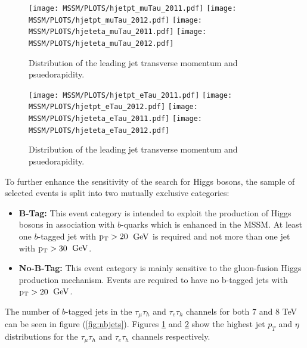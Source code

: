 \begin{figure}[htbp]
  \begin{center}
    \texttt{[image: MSSM/PLOTS/hjetpt\_muTau\_2011.pdf]}
    \texttt{[image: MSSM/PLOTS/hjetpt\_muTau\_2012.pdf]}
    \texttt{[image: MSSM/PLOTS/hjeteta\_muTau\_2011.pdf]}
    \texttt{[image: MSSM/PLOTS/hjeteta\_muTau\_2012.pdf]}
    \caption{
      Distribution of the leading jet transverse momentum and psuedorapidity.
    }
    \label{figure:mtJetKinematics}
  \end{center}
\end{figure}

\begin{figure}[htbp]
  \begin{center}
    \texttt{[image: MSSM/PLOTS/hjetpt\_eTau\_2011.pdf]}
    \texttt{[image: MSSM/PLOTS/hjetpt\_eTau\_2012.pdf]}
    \texttt{[image: MSSM/PLOTS/hjeteta\_eTau\_2011.pdf]}
    \texttt{[image: MSSM/PLOTS/hjeteta\_eTau\_2012.pdf]}
    \caption{
      Distribution of the leading jet transverse momentum and psuedorapidity.
    }
    \label{figure:etJetKinematics}
  \end{center}
\end{figure}

To further enhance the sensitivity of the search for Higgs bosons, the sample of selected events is split into
two mutually exclusive categories:
\begin{itemize}
\item {\bf B-Tag:} This event category is intended to exploit the production of Higgs bosons in association with $b$-quarks 
which is enhanced in the MSSM. At least one $b$-tagged jet with $\mathrm{p_{T}}>20$~$\mathrm{GeV}$ is required  and not more than one jet with $\mathrm{p_{T}}>30$~$\mathrm{GeV}$. 
\item {\bf No-B-Tag:} This event category is mainly sensitive to the gluon-fusion Higgs production mechanism. Events are required to have no b-tagged jets with $\mathrm{p_{T}}>20$~$\mathrm{GeV}$. 
\end{itemize}
The number of $b$-tagged jets in the $\tau_{\mu}\tau_{h}$ and $\tau_{e}\tau_{h}$
channels for both 7 and 8 TeV can be seen in figure (\ref{fig:nbjets}). Figures \ref{figure:mtJetKinematics}
and \ref{figure:etJetKinematics} show the highest jet $p_{T}$ and $\eta$ distributions
for the $\tau_{\mu}\tau_{h}$ and $\tau_{e}\tau_{h}$ channels respectively. 

